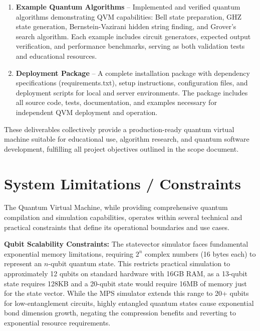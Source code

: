 \begin{enumerate}
    \item \textbf{Example Quantum Algorithms} – Implemented and verified quantum algorithms demonstrating QVM capabilities: Bell state preparation, GHZ state generation, Bernstein-Vazirani hidden string finding, and Grover's search algorithm. Each example includes circuit generators, expected output verification, and performance benchmarks, serving as both validation tests and educational resources.

    \item \textbf{Deployment Package} – A complete installation package with dependency specifications (requirements.txt), setup instructions, configuration files, and deployment scripts for local and server environments. The package includes all source code, tests, documentation, and examples necessary for independent QVM deployment and operation.
\end{enumerate}

These deliverables collectively provide a production-ready quantum virtual machine suitable for educational use, algorithm research, and quantum software development, fulfilling all project objectives outlined in the scope document.




\section{System Limitations / Constraints}

The Quantum Virtual Machine, while providing comprehensive quantum compilation and simulation capabilities, operates within several technical and practical constraints that define its operational boundaries and use cases.

\textbf{Qubit Scalability Constraints:} The statevector simulator faces fundamental exponential memory limitations, requiring $2^n$ complex numbers (16 bytes each) to represent an $n$-qubit quantum state. This restricts practical simulation to approximately 12 qubits on standard hardware with 16GB RAM, as a 13-qubit state requires 128KB and a 20-qubit state would require 16MB of memory just for the state vector. While the MPS simulator extends this range to 20+ qubits for low-entanglement circuits, highly entangled quantum states cause exponential bond dimension growth, negating the compression benefits and reverting to exponential resource requirements.

